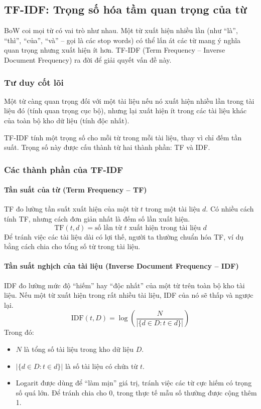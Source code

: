 \subsection{TF-IDF: Trọng số hóa tầm quan trọng của từ}
\label{ssec:tfidf}

BoW coi mọi từ có vai trò như nhau. Một từ xuất hiện nhiều lần (như “là”, “thì”, “của”, “và” -- gọi là các stop words) có thể lấn át các từ mang ý nghĩa quan trọng nhưng xuất hiện ít hơn. TF-IDF (Term Frequency -- Inverse Document Frequency) \cite{sparck1972statistical} ra đời để giải quyết vấn đề này.

\subsubsection{Tư duy cốt lõi}

Một từ càng quan trọng đối với một tài liệu nếu nó xuất hiện nhiều lần trong tài liệu đó (tính quan trọng cục bộ), nhưng lại xuất hiện ít trong các tài liệu khác của toàn bộ kho dữ liệu (tính độc nhất).

TF-IDF tính một trọng số cho mỗi từ trong mỗi tài liệu, thay vì chỉ đếm tần suất. Trọng số này được cấu thành từ hai thành phần: TF và IDF.

\subsubsection{Các thành phần của TF-IDF}

\paragraph{Tần suất của từ (Term Frequency -- TF)}
TF đo lường tần suất xuất hiện của một từ $t$ trong một tài liệu $d$. Có nhiều cách tính TF, nhưng cách đơn giản nhất là đếm số lần xuất hiện.
$$ \text{TF}(t, d) = \text{số lần từ } t \text{ xuất hiện trong tài liệu } d $$
Để tránh việc các tài liệu dài có lợi thế, người ta thường chuẩn hóa TF, ví dụ bằng cách chia cho tổng số từ trong tài liệu.

\paragraph{Tần suất nghịch của tài liệu (Inverse Document Frequency -- IDF)}
IDF đo lường mức độ “hiếm” hay “độc nhất” của một từ trên toàn bộ kho tài liệu. Nếu một từ xuất hiện trong rất nhiều tài liệu, IDF của nó sẽ thấp và ngược lại.
$$ \text{IDF}(t, D) = \log\left(\frac{N}{|\{d \in D : t \in d\}|}\right) $$
Trong đó:
\begin{itemize}
    \item $N$ là tổng số tài liệu trong kho dữ liệu $D$.
    \item $|\{d \in D : t \in d\}|$ là số tài liệu có chứa từ $t$.
    \item Logarit được dùng để “làm mịn” giá trị, tránh việc các từ cực hiếm có trọng số quá lớn. Để tránh chia cho 0, trong thực tế mẫu số thường được cộng thêm 1.
\end{itemize}

